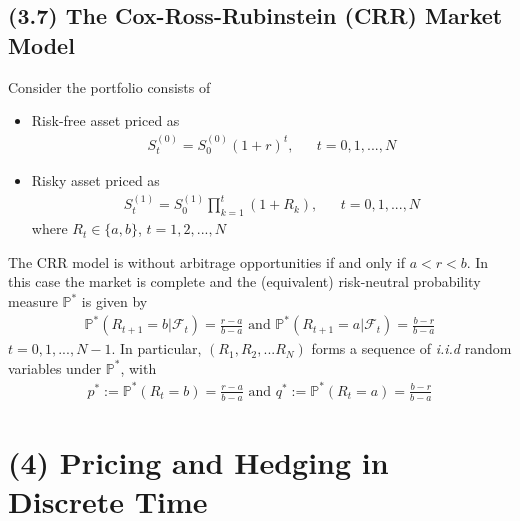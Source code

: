 \documentclass[12pt]{extarticle}
\newcommand{\<}{\langle}
\renewcommand{\>}{\rangle}
\theoremstyle{definition}
\begin{document}
\newpage
\subsection{(3.7) The Cox-Ross-Rubinstein (CRR) Market Model}
Consider the portfolio consists of
\begin{itemize}
    \item Risk-free asset priced as
    \begin{align*}
    S_t^{(0)} =S_0^{(0)} (1+r)^t, && t=0,1,...,N
    \end{align*}
    \item Risky asset priced as
    \begin{align*}
        S_t^{(1)} = S_0^{(1)}\prod^t_{k=1}(1+R_k), && t=0,1,...,N
    \end{align*}
    where $R_t \in \{a,b \}$,     $t=1,2,...,N$
\end{itemize}
\begin{tcolorbox}[enhanced, drop fuzzy shadow, title=Theorem 3.15]
The CRR model is without arbitrage opportunities if and only if $a<r<b$. In this case the market is complete and the (equivalent) risk-neutral probability measure $\mathbb{P}^*$ is given by
\begin{align*}
    \mathbb{P}^*(R_{t+1}=b|\mathcal{F}_t)=\frac{r-a}{b-a} \text{\ \ \ \ and\ \ \ \ }\mathbb{P}^*(R_{t+1}=a|\mathcal{F}_t)=\frac{b-r}{b-a}
\end{align*}
$t=0,1,...,N-1$. In particular, $(R_1,R_2,...R_N)$ forms a sequence of \textit{i.i.d} random variables under $\mathbb{P}^*$, with
\begin{align*}
    p^* := \mathbb{P}^*(R_{t}=b)=\frac{r-a}{b-a} \text{\ \ \ \ and\ \ \ \ } q^* := \mathbb{P}^*(R_{t}=a)=\frac{b-r}{b-a}
\end{align*}
\end{tcolorbox}



\newpage
\section{(4) Pricing and Hedging in Discrete Time}
\end{document}
